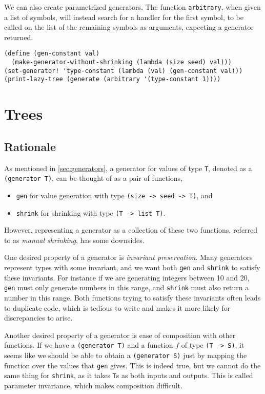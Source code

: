 \documentclass{scrartcl}
\begin{document}
We can also create parametrized generators. The function \verb|arbitrary|, when
given a list of symbols, will instead search for a handler for the first symbol,
to be called on the list of the remaining symbols as arguments, expecting a
generator returned.

\begin{verbatim}
(define (gen-constant val)
  (make-generator-without-shrinking (lambda (size seed) val)))
(set-generator! 'type-constant (lambda (val) (gen-constant val)))
(print-lazy-tree (generate (arbitrary '(type-constant 1))))
\end{verbatim}


\section{Trees}\label{sec:trees}
\subsection{Rationale}
As mentioned in \cref{sec:generators}, a generator for values of type \verb|T|,
denoted as a \verb|(generator T)|,
can be thought of as a pair of functions,
\begin{itemize}
  \item \verb|gen| for value generation
        with type \verb|(size -> seed -> T)|, and
  \item \verb|shrink| for shrinking with type \verb|(T -> list T)|.
\end{itemize}
However, representing a generator as a collection of these two functions,
referred to as \emph{manual shrinking}, has some downsides.

One desired property of a generator is \emph{invariant preservation}.
Many generators represent types with some invariant,
and we want both \verb|gen| and \verb|shrink| to satisfy these invariants.
For instance if we are generating integers between 10 and 20,
\verb|gen| must only generate numbers in this range,
and \verb|shrink| must also return a number in this range.
Both functions trying to satisfy these invariants
often leads to duplicate code, which is tedious to write and
makes it more likely for discrepancies to arise.

Another desired property of a generator is
ease of composition with other functions.
If we have a \verb|(generator T)| and a function \(f\) of type \verb|(T -> S)|,
it seems like we should be able to obtain a \verb|(generator S)| just by
mapping the function over the values that \verb|gen| gives.
This is indeed true, but we cannot do the same thing for \verb|shrink|,
as it takes \verb|T|s as both inputs and outputs.
This is called parameter invariance, which makes composition difficult.
\end{document}
